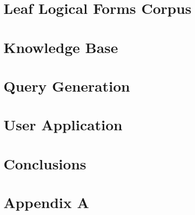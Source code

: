 \documentclass [11pt, proquest] {uwthesis}[2020/02/24]
\begin{document}
\chapter{Leaf Logical Forms Corpus}
\label{sec:llf_corpus}


\chapter{Knowledge Base}
\label{sec:kb}


\chapter{Query Generation}
\label{sec:query_generation}


\chapter{User Application}
\label{sec:user_application}

 
\chapter{Conclusions}
\label{sec:conclusions}

 
\printendnotes

%
%


%
%
\appendix
\raggedbottom\sloppy
 
 \chapter{Appendix A}
\label{sec:appendix_a}

\end{document}
